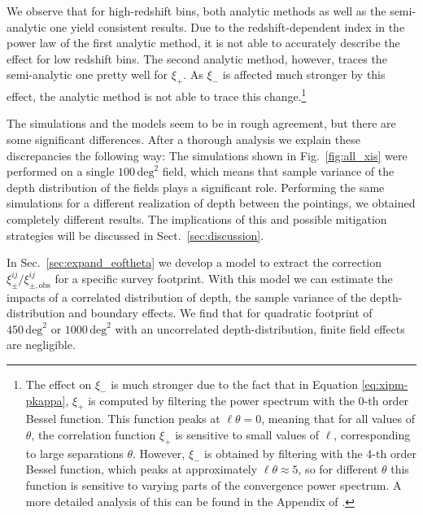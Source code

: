 \documentclass[referee]{aa} %
\renewcommand{\[}{\begin{equation}}
\renewcommand{\]}{\end{equation}}
\renewcommand{\rm}{\mathrm}
\begin{document}
We observe that for high-redshift bins, both analytic methods as well as the semi-analytic one yield consistent results. Due to the redshift-dependent index in the power law of the first analytic method, it is not able to accurately describe the effect for low redshift bins. The second analytic method, however, traces the semi-analytic one pretty well for $\xi_+$. As $\xi_-$ is affected much stronger by this effect, the analytic method is not able to trace this change.\footnote{The effect on $\xi_-$ is much stronger due to the fact that in Equation \eqref{eq:xipm-pkappa}, $\xi_+$ is computed by filtering the power spectrum with the 0-th order Bessel function. This function peaks at $\ell\theta=0$, meaning that for all values of $\theta$, the correlation function $\xi_+$ is sensitive to small values of $\ell$, corresponding to large separations $\theta$. However, $\xi_-$ is obtained by filtering with the 4-th order Bessel function, which peaks at approximately $\ell\theta\approx 5$, so for different $\theta$ this function is sensitive to varying parts of the convergence power spectrum. A more detailed analysis of this can be found in the Appendix of \citet{2017MNRAS.471.4412K}.}

The simulations and the models seem to be in rough agreement, but there are some significant differences. After a thorough analysis we explain these discrepancies the following way: The simulations shown in Fig.~\ref{fig:all_xis} were performed on a single $100\,\rm{deg}^2$ field, which means that sample variance of the depth distribution of the fields plays a significant role. Performing the same simulations for a different realization of depth between the pointings, we obtained completely different results. The implications of this and possible mitigation strategies will be discussed in Sect.~\ref{sec:discussion}. 

In Sec.~\ref{sec:expand_eoftheta} we develop a model to extract the correction $\xi_\pm^{ij}/\xi_{\pm,\rm{obs}}^{ij}$ for a specific survey footprint. With this model we can estimate the impacts of a correlated distribution of depth, the sample variance of the depth-distribution and boundary effects. We find that for quadratic footprint of $450\,\rm{deg}^2$ or $1000\,\rm{deg}^2$ with an uncorrelated depth-distribution, finite field effects are negligible.
\end{document}
